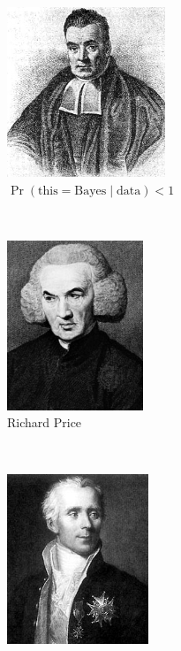 \documentclass[12pt]{article}
\begin{document}
\begin{figure}
    \centering
    \begin{subfigure}[t]{0.33\textwidth}
        \centering
        \includegraphics[height=2in]{Bayes.jpg}
        \caption*{$\Pr(\text{this}=\text{Bayes}\mid \text{data}) < 1$}
    \end{subfigure}%
    ~ 
    \begin{subfigure}[t]{0.33\textwidth}
        \centering
        \includegraphics[height=2in]{Price.jpg}
        \caption*{Richard Price}
    \end{subfigure}%
    ~
    \begin{subfigure}[t]{0.33\textwidth}
        \centering
        \includegraphics[height=2in]{Laplace.jpg}

\end{subfigure}
\end{figure}
\end{document}
